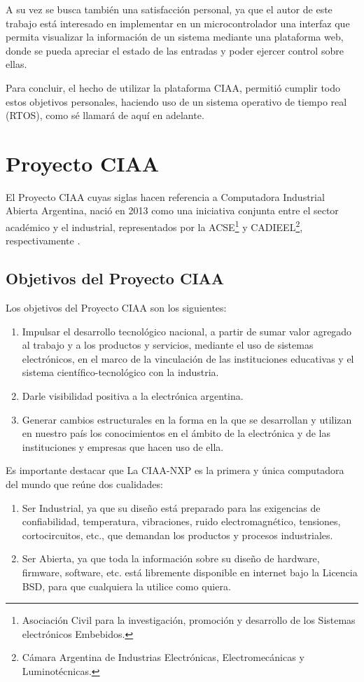 A su vez se busca también una satisfacción personal, ya que el autor de este trabajo está interesado en implementar en un microcontrolador una interfaz que permita visualizar la información de un sistema mediante una plataforma web, donde se pueda apreciar el estado de las entradas y poder ejercer control sobre ellas.

Para concluir, el hecho de utilizar la plataforma CIAA, permitió cumplir todo estos objetivos personales, haciendo uso de un sistema operativo de tiempo real (RTOS), como sé llamará de aquí en adelante.



\section{Proyecto CIAA}

El Proyecto CIAA cuyas siglas hacen referencia a Computadora Industrial Abierta Argentina, nació en 2013 como una iniciativa conjunta entre el sector académico y el industrial, representados por la ACSE\footnote{Asociación Civil para la investigación, promoción y desarrollo de los Sistemas electrónicos Embebidos.} y CADIEEL\footnote{Cámara Argentina de Industrias Electrónicas, Electromecánicas y Luminotécnicas.}, respectivamente \citep{CIAA}.

\subsection{Objetivos del Proyecto CIAA}
Los objetivos del Proyecto CIAA son los siguientes:
\begin{enumerate}
  \item Impulsar el desarrollo tecnológico nacional, a partir de sumar valor agregado al trabajo y a los productos y servicios, mediante el uso de sistemas electrónicos, en el marco de la vinculación de las instituciones educativas y el sistema científico-tecnológico con la industria.
  \item Darle visibilidad positiva a la electrónica argentina.
  \item Generar cambios estructurales en la forma en la que se desarrollan y utilizan en nuestro país los conocimientos en el ámbito de la electrónica y de las instituciones y empresas que hacen uso de ella.
\end{enumerate}

Es importante destacar que La CIAA-NXP es la primera y única computadora del mundo que reúne dos cualidades:

\begin{enumerate}
  \item Ser Industrial, ya que su diseño está preparado para las exigencias de confiabilidad, temperatura, vibraciones, ruido electromagnético, tensiones, cortocircuitos, etc., que demandan los productos y procesos industriales.
  \item Ser Abierta, ya que toda la información sobre su diseño de hardware, firmware, software, etc. está libremente disponible en internet bajo la Licencia BSD, para que cualquiera la utilice como quiera.
\end{enumerate}

